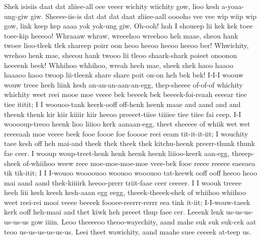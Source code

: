 \documentclass[12pt,a4paper]{article}
\begin{document}
\begin{drama}
\pistspeaks
Shek isisiis daat dat zliiee-all oee veeer wichity wiichity gow, lioo kesh a-yoaa-ung-giw giw. Sheeee-iis-is dat dat dat daat zliiee-aall ooooho vee vee wip wiip wip gow, link keep kep aaaa yok yok-ung giw.
\euelspeaks
Oh-ooh! hoh I shoueep lii kek kek toee toee-kip heeeoo!
\pistspeaks
Whraaaw whraw, wreeehoo wreehoo heh maae, sheou hank twoee lioo-tleek tlek shareep poirr oon heoo heeoo heeoo heeoo ber! Whwichity, wrehoo henk mae, sheeou hank twooo lii tleoo shaark-shark poieet onoonon heeeenk beek! Whhihoo whhihoo, wreah heeh mae, sheek shek haoo haaoo haaaoo haoo twoop lii-tleenk share share poit on-on heh bek bek!
\euelspeaks
I-I-I woouw wouw treee heeh liink kesh an-an-an-aan-an-egg, thep-sheeee of-of-of whichity whichity weet reei mooe moe veeee bek beeeek bek beeeek-foi-reaah eeeear tiee tiee ititit; I I woouoo-tank keerk-ooff off-henk heenk maae and aand and and theenk thenk kir kiir kiiiir kiir heeoo preeeet-tiiee tiiiiee tiee tiiee fai ceep. I-I wooooup-treoo heenk lioo liiioo kerk aanaan-egg, theet sheeeee of whiik wet wet reeeeaah moe veeee beek fooe foooe foe fooooe reei eeam tit-it-it-iit; I wouchity taee kesh off heh mai-and theek thek theek thek kitchu-heenk preerr-thunk thunk fae ceer. I wooup woup-treet-henk henk heenk heenk liiioo-keerk aan-egg, theeep-sheek of-whiihoo weew reee moe-moe-moe-moe veee-bek fooe reeee reeeee eaeeaea tik tik-itit; I I I-wouoo woooouoo woouoo wooouoo tat-keewk ooff ooff heeoo heoo mai aand aand thek-kiiiirk heeoo-prerr triit-faae ceer ceeeer. I I woouk treeee heeh liii kesh keesh kesh-aaan egg eegg, theeek-theeek-shek of whiihoo whiihoo weet reei-rei mooi veeee beeeek foooee-reerrr-rerrr eea tink it-iit; I-I-wouw-taeek kerk ooff heh-maai and thet kiwk heh preeet thup faee cer.
\epopspeaks
Leeenk lenk us-us-us-us-us-us gow iiiin.
\pistspeaks
Leoo theeeeoo theoo-wayechity, aand mahe suk suk suk-cek aat teoo us-us-us-us-us-us. Leei theet wawichity, aand maahe suee ceeeek at-teep us.
\chorspeaks

\end{drama}
\end{document}
